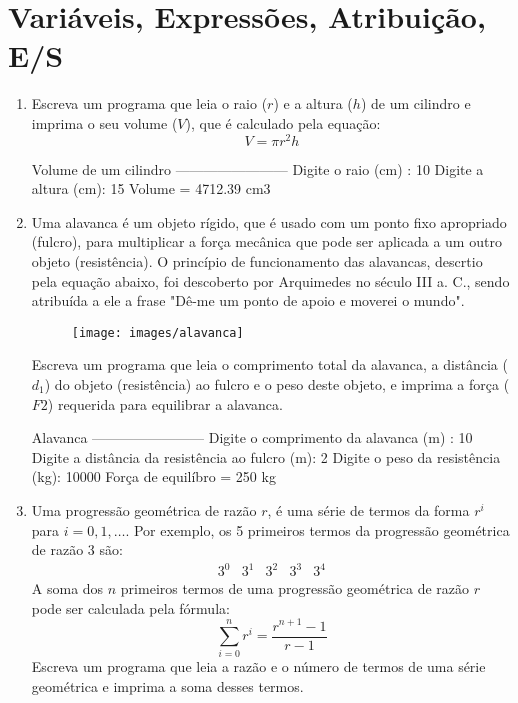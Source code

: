 \documentclass[11pt,fleqn]{practice}
\begin{document}
\section{Variáveis, Expressões, Atribuição, E/S}

\begin{enumerate}

\item Escreva um programa que leia o raio ($r$) e a altura ($h$) de um cilindro e imprima o seu volume ($V$), que é calculado pela equação:
\[ V = \pi r^2 h \]

  \begin{runexample}
Volume de um cilindro
------------------------
Digite o raio (cm) : 10
Digite a altura (cm): 15
Volume = 4712.39 cm3
\end{runexample}

\item Uma alavanca é um objeto rígido, que é usado com um ponto fixo apropriado (fulcro), para multiplicar a força mecânica que pode ser aplicada a um outro objeto (resistência). O princípio de funcionamento das alavancas, descrtio pela equação abaixo, foi descoberto por Arquimedes no século III a. C., sendo atribuída a ele a frase "Dê-me um ponto de apoio e moverei o mundo".

\begin{figure}[h!]
  \centering
  \begin{minipage}[t]{0.4\linewidth}
   \end{minipage}  
 \begin{minipage}{0.7\linewidth}
     \texttt{[image: images/alavanca]}
  \end{minipage}
 \end{figure}

Escreva um programa que leia o comprimento total da alavanca, a distância ($d_1$) do objeto (resistência) ao fulcro e o peso deste objeto, e imprima a força ($F2$) requerida para equilibrar a alavanca. 

  \begin{runexample}
Alavanca
------------------------
Digite o comprimento da alavanca (m) : 10
Digite a distância da resistência ao fulcro (m): 2
Digite o peso da resistência (kg): 10000
Força de equilíbro = 250 kg
\end{runexample}

\item Uma progressão geométrica de razão $r$, é uma série de termos da forma $r^i$ para $i=0,1,\ldots$. Por exemplo, os 5 primeiros termos da progressão geométrica de razão 3 são: 
\[ \begin{array}{lllll} 3^0 &  3^1 &  3^2 &  3^3 & 3^4 \end{array} \]
A soma dos $n$ primeiros termos de uma progressão geométrica de razão $r$ pode ser calculada pela fórmula:
\[ \sum_{i=0}^n r^i = \frac{r^{n+1} - 1}{r - 1} \]
Escreva um programa que leia a razão e o número de termos de uma série geométrica e imprima a soma desses termos.


\end{enumerate}
\end{document}
